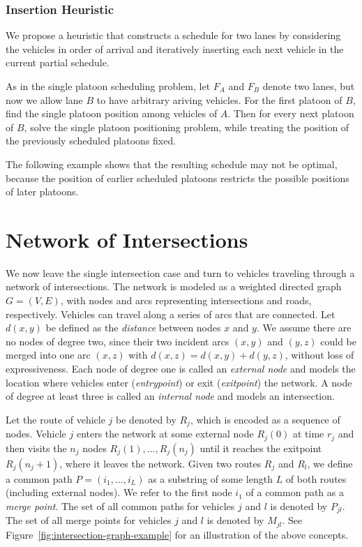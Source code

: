 \documentclass{article}
\newcommand{\inline}[1]{ {\color{blue}{#1}}\addcontentsline{tdo}{todo}{#1}}
\theoremstyle{definition}
\theoremstyle{plain}
\begin{document}
\subsubsection{Insertion Heuristic}

We propose a heuristic that constructs a schedule for two lanes by considering
the vehicles in order of arrival and iteratively inserting each next vehicle in
the current partial schedule.

As in the single platoon scheduling problem, let $F_{A}$ and $F_{B}$ denote two
lanes, but now we allow lane $B$ to have arbitrary ariving vehicles. For the
first platoon of $B$, find the single platoon position among vehicles of $A$.
Then for every next platoon of $B$, solve the single platoon positioning
problem, while treating the position of the previously scheduled platoons fixed.


The following example shows that the resulting schedule may not be optimal,
because the position of earlier scheduled platoons restricts the possible
positions of later platoons.
\begin{eg}
  \inline{come up with example}
\end{eg}


\newpage

\section{Network of Intersections}

We now leave the single intersection case and turn to vehicles traveling through
a network of intersections. The network is modeled as a weighted directed graph
$G=(V,E)$, with nodes and arcs representing intersections and roads,
respectively. Vehicles can travel along a series of arcs that are connected. Let
$d(x,y)$ be defined as the \textit{distance} between nodes $x$ and $y$. We
assume there are no nodes of degree two, since their two incident arcs $(x,y)$
and $(y,z)$ could be merged into one arc $(x,z)$ with
$d(x,z) = d(x,y) + d(y,z)$, without loss of expressiveness. Each node of degree
one is called an \textit{external node} and models the location where vehicles
enter (\textit{entrypoint}) or exit (\textit{exitpoint}) the network. A node of
degree at least three is called an \textit{internal node} and models an
intersection.

Let the route of vehicle $j$ be denoted by $R_{j}$, which is encoded as a
sequence of nodes. Vehicle $j$ enters the network at some external node
$R_{j}(0)$ at time $r_{j}$ and then visits the $n_{j}$ nodes
$R_{j}(1), \dots, R_{j}(n_{j})$ until it reaches the exitpoint
$R_{j}(n_{j} + 1)$, where it leaves the network.
Given two routes $R_{j}$ and $R_{l}$, we define a common path
$P=(i_{1},\dots,i_{L})$ as a substring of some length $L$ of both routes
(including external nodes). We refer to the first node $i_{1}$ of a common path
as a \textit{merge point}. The set of all common paths for vehicles $j$ and $l$
is denoted by $P_{jl}$. The set of all merge points for vehicles $j$ and $l$ is
denoted by $M_{jl}$. See Figure~\ref{fig:intersection-graph-example} for an
illustration of the above concepts.
\end{document}
